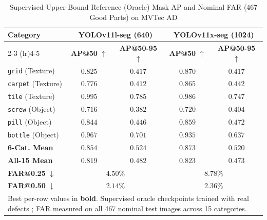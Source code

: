 \begin{table}[t]
\centering
\caption{Supervised Upper-Bound Reference (Oracle) Mask AP and Nominal FAR (467 Good Parts) on MVTec AD}
\label{tab:per_category_real}
\setlength{\tabcolsep}{3pt}
\begin{tabular}{l c c c c}
\toprule
\multirow{2}{*}{\textbf{Category}} & \multicolumn{2}{c}{\textbf{YOLOv11l-seg (640)}} & \multicolumn{2}{c}{\textbf{YOLOv11x-seg (1024)}} \\
\cmidrule(lr){2-3} \cmidrule(lr){4-5}
 & \textbf{AP@50} $\uparrow$ & \textbf{AP@50-95} $\uparrow$ & \textbf{AP@50} $\uparrow$ & \textbf{AP@50-95} $\uparrow$ \\
\midrule
\texttt{grid} (Texture)   & $0.825$ & $0.417$ & $\mathbf{0.870}$ & $0.417$ \\
\texttt{carpet} (Texture) & $0.776$ & $0.412$ & $\mathbf{0.865}$ & $\mathbf{0.442}$ \\
\texttt{tile} (Texture)   & $\mathbf{0.995}$ & $\mathbf{0.785}$ & $0.986$ & $0.747$ \\
\texttt{screw} (Object)   & $0.716$ & $0.382$ & $\mathbf{0.720}$ & $\mathbf{0.404}$ \\
\texttt{pill} (Object)    & $0.844$ & $0.446$ & $\mathbf{0.859}$ & $\mathbf{0.472}$ \\
\texttt{bottle} (Object)  & $\mathbf{0.967}$ & $\mathbf{0.701}$ & $0.935$ & $0.637$ \\
\midrule
\textbf{6-Cat. Mean}      & $0.854$ & $\mathbf{0.524}$ & $\mathbf{0.873}$ & $0.520$ \\
\textbf{All-15 Mean}      & $0.819$ & $\mathbf{0.482}$ & $\mathbf{0.823}$ & $0.473$ \\
\midrule
\textbf{FAR@0.25} $\downarrow$ & \multicolumn{2}{c}{$\mathbf{4.50\%}$} & \multicolumn{2}{c}{$8.78\%$} \\
\textbf{FAR@0.50} $\downarrow$ & \multicolumn{2}{c}{$\mathbf{2.14\%}$} & \multicolumn{2}{c}{$2.36\%$} \\
\bottomrule
\multicolumn{5}{p{0.94\columnwidth}}{\footnotesize Best per-row values in \textbf{bold}. Supervised oracle checkpoints trained with real defects \cite{kudupudi2025industrial}; FAR measured on all 467 nominal test images across 15 categories.}
\end{tabular}
\end{table}

